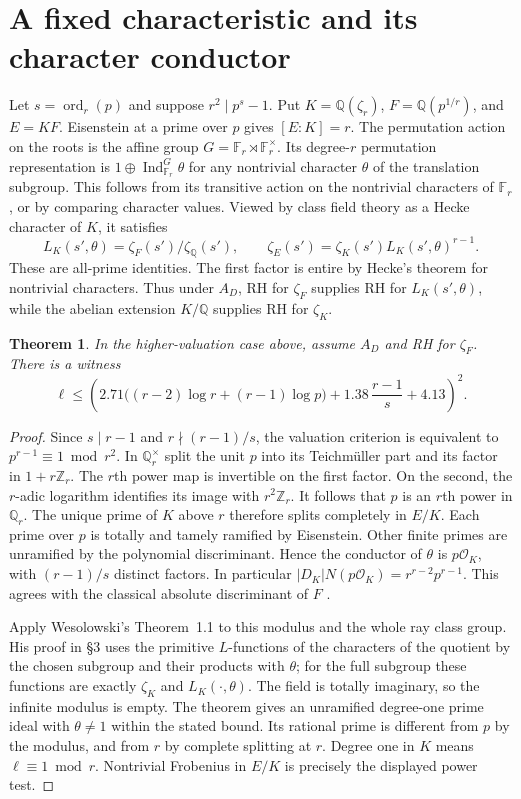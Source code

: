 \documentclass[11pt]{article}
\newtheorem{theorem}{Theorem}
\newcommand{\Q}{\mathbb Q}
\newcommand{\F}{\mathbb F}
\newcommand{\ord}{\operatorname{ord}}
\begin{document}
\section{A fixed characteristic and its character conductor}
Let $s=\ord_r(p)$ and suppose $r^2\mid p^s-1$. Put
$K=\Q(\zeta_r)$, $F=\Q(p^{1/r})$, and $E=KF$.
Eisenstein at a prime over $p$ gives $[E:K]=r$.
The permutation action on the roots is the affine group
$G=\F_r\rtimes\F_r^\times$. Its degree-$r$ permutation representation is
$1\oplus\operatorname{Ind}_{\F_r}^{G}\theta$ for any nontrivial character
$\theta$ of the translation subgroup. This follows from its transitive
action on the nontrivial characters of $\F_r$, or by comparing character values.
Viewed by class field theory as a Hecke character of $K$, it satisfies
\[
 L_K(s',\theta)=\zeta_F(s')/\zeta_{\Q}(s'),\qquad
 \zeta_E(s')=\zeta_K(s')L_K(s',\theta)^{r-1}.
\]
These are all-prime identities. The first factor is entire by Hecke's theorem for
nontrivial characters. Thus under $A_D$, RH for $\zeta_F$ supplies RH for
$L_K(s',\theta)$, while the abelian extension $K/\Q$ supplies RH for $\zeta_K$.

\begin{theorem}\label{weso}
In the higher-valuation case above, assume $A_D$ and RH for $\zeta_F$. There is a witness
\[
 \ell\le
 \left(2.71\big((r-2)\log r+(r-1)\log p\big)
     +1.38\,\frac{r-1}{s}+4.13\right)^2.
\]
\end{theorem}
\begin{proof}
Since $s\mid r-1$ and $r\nmid(r-1)/s$, the valuation criterion is equivalent to
$p^{r-1}\equiv1\bmod r^2$. In $\Q_r^\times$ split the unit $p$ into its
Teichm\"uller part and its factor in $1+r\mathbb Z_r$. The $r$th power map
is invertible on the first factor. On the second, the $r$-adic logarithm
identifies its image with $r^2\mathbb Z_r$. It follows that $p$ is an $r$th
power in $\Q_r$. The unique prime of $K$ above $r$ therefore splits completely
in $E/K$. Each prime over $p$ is totally and tamely ramified by Eisenstein.
Other finite primes are unramified by the polynomial discriminant. Hence the
conductor of $\theta$ is $p\mathcal O_K$, with $(r-1)/s$ distinct factors.
In particular $|D_K|N(p\mathcal O_K)=r^{r-2}p^{r-1}$.
This agrees with the classical absolute discriminant of $F$
\cite[Lemma 3.1(ii)]{Holmes}.

Apply Wesolowski's Theorem~1.1 \cite{W} to this modulus and the whole ray class
group. His proof in \S3 uses the primitive $L$-functions of the characters
of the quotient by the chosen subgroup and their products with $\theta$;
for the full subgroup these functions are exactly $\zeta_K$ and $L_K(\cdot,\theta)$.
The field is totally imaginary, so the infinite modulus is empty.
The theorem gives an unramified degree-one prime ideal with $\theta\ne1$ within
the stated bound. Its rational prime is different from $p$ by the modulus,
and from $r$ by complete splitting at $r$. Degree one in $K$ means
$\ell\equiv1\bmod r$. Nontrivial Frobenius in $E/K$ is precisely the displayed
power test.
\end{proof}
\end{document}
